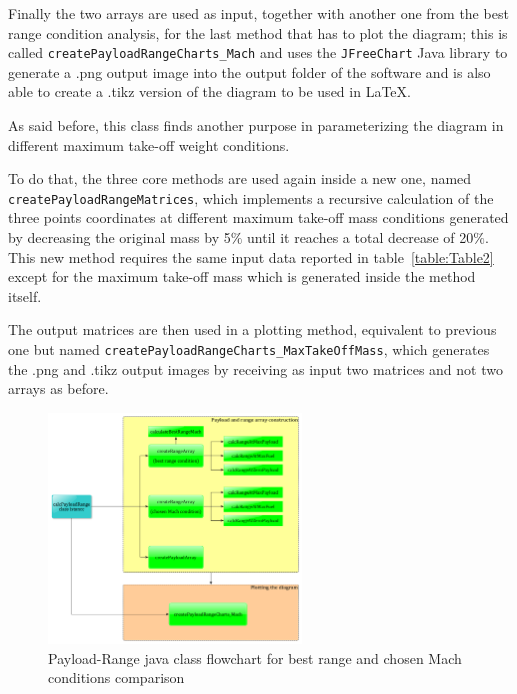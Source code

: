 \documentclass[a4paper,12pt,oneside]{book}
\begin{document}
\bigskip
Finally the two arrays are used as input, together with another one from the best range condition analysis, for the last method that has to plot the diagram; this is called \lstinline[language=Java]!createPayloadRangeCharts_Mach! and uses the \lstinline[language=Java]!JFreeChart! Java library to generate a .png output image into the output folder of the software and is also able to create a .tikz version of the diagram to be used in \LaTeX.

As said before, this class finds another purpose in parameterizing the diagram in different maximum take-off weight conditions.

To do that, the three core methods are used again inside a new one, named \lstinline[language=Java]!createPayloadRangeMatrices!, which implements a recursive calculation of the three points coordinates at different maximum take-off mass conditions generated by decreasing the original mass by 5$\%$ until it reaches a total decrease of 20$\%$. This new method requires the same input data reported in table~\ref{table:Table2} except for the maximum take-off mass which is generated inside the method itself.

The output matrices are then used in a plotting method, equivalent to previous one but named \lstinline[language=Java]!createPayloadRangeCharts_MaxTakeOffMass!, which generates the .png and .tikz output images by receiving as input two matrices and not two arrays as before.

\begin{figure}[!ht]
\centering
\includegraphics[keepaspectratio, width=0.6\textwidth]{PayloadRange_BestRange_Flowchart}
\caption{Payload-Range java class flowchart for best range and chosen Mach conditions comparison}
\label{fig:Figure3}
\end{figure}
\end{document}
